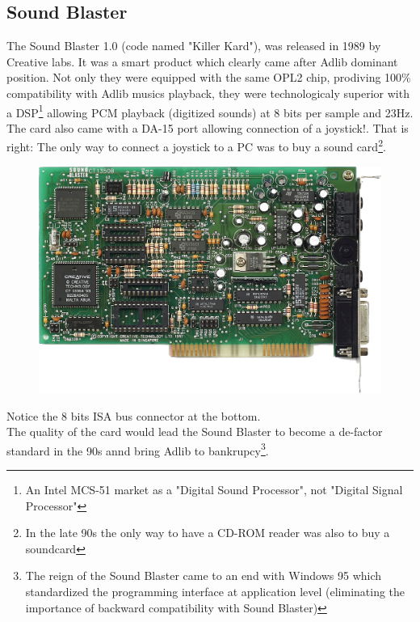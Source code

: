 \documentclass[book.tex]{subfiles}
\begin{document}
  \subsection{Sound Blaster}
  The Sound Blaster 1.0 (code named "Killer Kard"), was released in 1989 by Creative labs. It was a smart product which clearly came after Adlib dominant position. Not only they were equipped with the same OPL2 chip, prodiving 100\% compatibility with Adlib musics playback, they were technologicaly superior with a DSP\footnote{An Intel MCS-51 market as a "Digital Sound Processor", not "Digital Signal Processor"}  allowing PCM playback (digitized sounds) at 8 bits per sample and 23Hz. The card also came with a DA-15 port allowing connection of a joystick!. That is right: The only way to connect a joystick to a PC was to buy a sound card\footnote{In the late 90s the only way to have a CD-ROM reader was also to buy a soundcard}.\\ 
\par

\begin{figure}[H] \centering \includegraphics[width=\textwidth]{imgs/hardware/sb.png} \end{figure}
 Notice the 8 bits ISA bus connector at the bottom.\\
   The quality of the card would lead the Sound Blaster to become a de-factor standard in the 90s annd bring Adlib to bankrupcy\footnote{The reign of the Sound Blaster came to an end with Windows 95 which standardized the programming interface at application level (eliminating the importance of backward compatibility with Sound Blaster)}.
\end{document}
